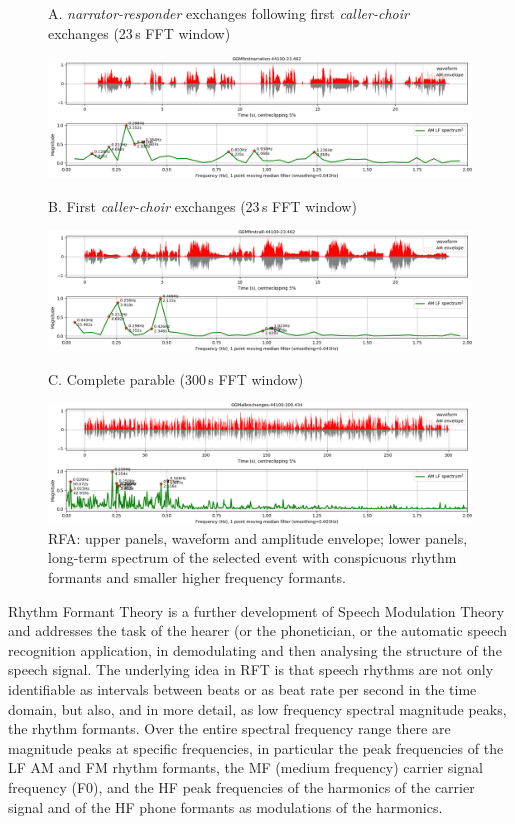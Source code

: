 \documentclass[output=paper,colorlinks,citecolor=brown]{langscibook}
\begin{document}
\begin{figure}
{\footnotesize A. \textit{narrator-responder} exchanges following first \textit{caller-choir} exchanges (23\,s FFT window)}

\includegraphics[width=\textwidth]{gibbon_figure06A.png}

{\footnotesize B. First \textit{caller-choir} exchanges (23\,s FFT window)}

\includegraphics[width=\textwidth]{gibbon_figure06B.png}

{\footnotesize C. Complete parable (300\,s FFT window)}

\includegraphics[width=\textwidth]{gibbon_figure06C.png}
\caption{\label{fig:fig06}RFA: upper panels, waveform and amplitude envelope; lower panels, long-term spectrum of the selected event with conspicuous rhythm formants and smaller higher frequency formants.}
\end{figure}

Rhythm Formant Theory is a further development of Speech Modulation Theory and addresses the task of the hearer (or the phonetician, or the automatic speech recognition application, in demodulating and then analysing the structure of the speech signal. The underlying idea in RFT \citep{gibbonsp2018, gibbonjipa2021, gibbonsp2022} is that speech rhythms are not only identifiable as intervals between beats or as beat rate per second in the time domain, but also, and in more detail, as low frequency spectral magnitude peaks, the rhythm formants. Over the entire spectral frequency range there are magnitude peaks at specific frequencies, in particular the peak frequencies of the LF AM and FM rhythm formants, the MF (medium frequency) carrier signal frequency (F0), and the HF peak frequencies of the harmonics of the carrier signal and of the HF phone formants as modulations of the harmonics.
\end{document}
